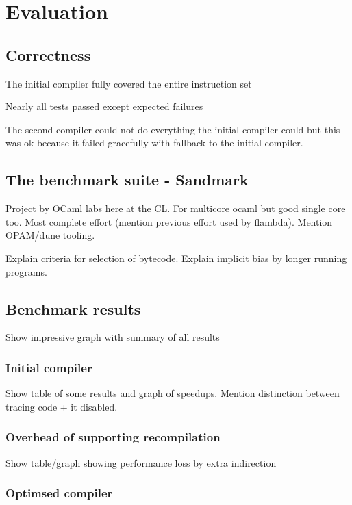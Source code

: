 \chapter{Evaluation}

\section{Correctness}

The initial compiler fully covered the entire instruction set

Nearly all tests passed except expected failures

The second compiler could not do everything the initial compiler could but this was ok because it
failed gracefully with fallback to the initial compiler.

\section{The benchmark suite - Sandmark}

Project by OCaml labs here at the CL. For multicore ocaml but good single core too. Most complete
effort (mention previous effort used by flambda). Mention OPAM/dune tooling.

Explain criteria for selection of bytecode. Explain implicit bias by longer running programs.

\section{Benchmark results}

Show impressive graph with summary of all results

\subsection{Initial compiler}

Show table of some results and graph of speedups. Mention distinction between tracing code + it
disabled.

\subsection{Overhead of supporting recompilation}

Show table/graph showing performance loss by extra indirection

\subsection{Optimsed compiler}

